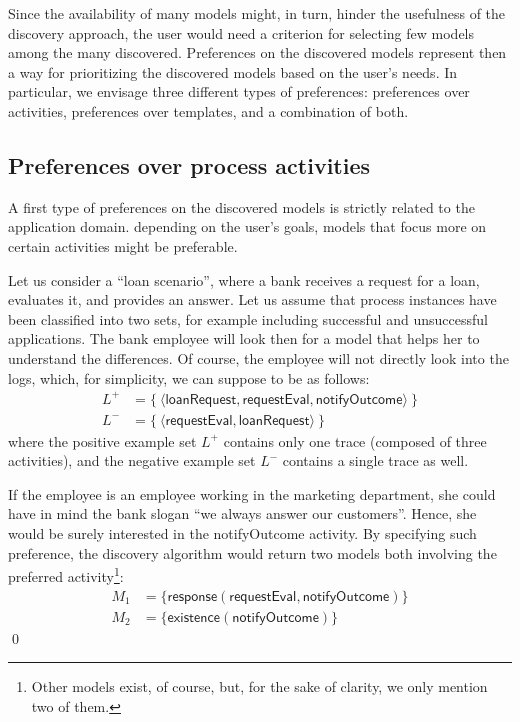 Since the availability of many models might, in turn, hinder the usefulness of the discovery approach, the  user would need a criterion for selecting few models among the many discovered.
%
Preferences on the discovered models represent then a way for prioritizing the discovered models based on the  user's needs. In particular, we envisage three different types of preferences: preferences over activities, preferences over templates, and a combination of both.



\subsection{Preferences over process activities}
\label{subsec:prefOverActivities}

A first type of preferences on the discovered models is strictly related to the application domain.   depending on the  user's goals, models that focus more on certain activities might be preferable.

\begin{example}
\label{ex:prefOverActivities}
Let us consider a ``loan scenario'', where a bank receives a request for a loan, evaluates it, and provides an answer. Let us assume that process instances have been classified into two sets, for example including successful and unsuccessful applications. The bank employee will look then for a model that helps her to understand the differences. Of course, the employee will not directly look into the logs, which, for simplicity, we can suppose to be as follows:
%
\begin{align*}
L^{+}& = \{\ \langle \mathsf{loanRequest}, \mathsf{requestEval}, \mathsf{notifyOutcome} \rangle \ \} \\
L^- & = \{\ \langle \mathsf{requestEval}, \mathsf{loanRequest} \rangle \ \}
\end{align*}
%
where the positive example set $L^+$ %
contains only one trace (composed of
 three activities), and the negative example set $L^-$ %
 contains a single trace as well.

\noindent If the employee is an employee working in the marketing department, she could have in mind the bank slogan ``we always answer our customers''. Hence, she would be surely interested in the \textsf{notifyOutcome} activity. By specifying such preference, the discovery algorithm would return two models both involving the preferred activity\footnote{Other models exist, of course, but, for the sake of clarity, we only mention two of them.}:
%
\begin{align*}
M_1 & = \{ \mathsf{response(requestEval, notifyOutcome)}\} \\
M_2 & = \{ \mathsf{existence(notifyOutcome)}\}
\end{align*}
%
\qed
%
\end{example}

